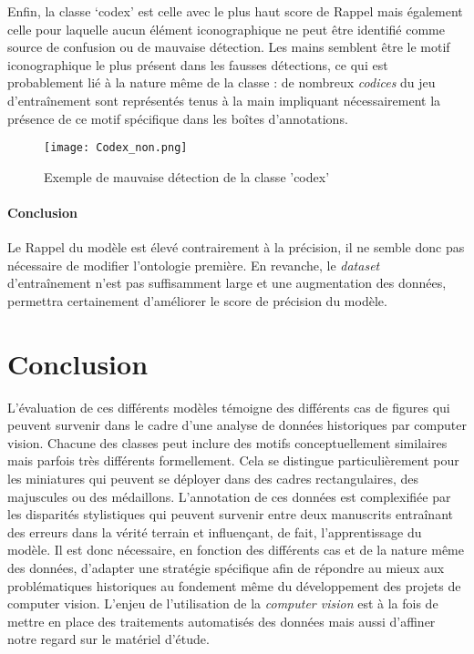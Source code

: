 \documentclass[12pt,twoside]{book}
\begin{document}
\newpage
Enfin, la classe ‘codex’ est celle avec le plus haut score de Rappel mais également celle pour laquelle aucun élément iconographique ne peut être identifié comme source de confusion ou de mauvaise détection. Les mains semblent être le motif iconographique le plus présent dans les fausses détections, ce qui est probablement lié à la nature même de la classe : de nombreux \textit{codices} du jeu d’entraînement sont représentés tenus à la main impliquant nécessairement la présence de ce motif spécifique dans les boîtes d’annotations. 

\begin{figure}[ht]
    \centering
    \begin{minipage}[b]{0.45\textwidth}
        \centering
        \texttt{[image: Codex\_non.png]}
        \caption{Exemple de mauvaise détection de la classe 'codex'}
    \end{minipage}
\end{figure}

\paragraph{Conclusion}Le Rappel du modèle est élevé contrairement à la précision, il ne semble donc pas nécessaire de modifier l’ontologie première. En revanche, le \textit{dataset } d’entraînement n’est pas suffisamment large et une augmentation des données, permettra certainement d’améliorer le score de précision du modèle. 


\section*{Conclusion}

L’évaluation de ces différents modèles témoigne des différents cas de figures qui peuvent survenir dans le cadre d’une analyse de données historiques par computer vision. Chacune des classes peut inclure des motifs conceptuellement similaires mais parfois très différents formellement. Cela se distingue particulièrement pour les miniatures qui peuvent se déployer dans des cadres rectangulaires, des majuscules ou des médaillons. L’annotation de ces données est complexifiée par les disparités stylistiques qui peuvent survenir entre deux manuscrits entraînant des erreurs dans la vérité terrain et influençant, de fait, l’apprentissage du modèle. Il est donc nécessaire, en fonction des différents cas et de la nature même des données, d’adapter une stratégie spécifique afin de répondre au mieux aux problématiques historiques au fondement même du développement des projets de computer vision. L’enjeu de l’utilisation de la \textit{computer vision} est à la fois de mettre en place des traitements automatisés des données mais aussi d’affiner notre regard sur le matériel d’étude. 
\end{document}
